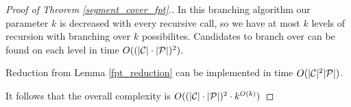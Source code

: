 \begin{proof}[Proof of Theorem \ref{segment_cover_fpt}.]
In this branching algorithm our parameter $k$ is decreased with every
recursive call, so we have at most $k$ levels of recursion with
branching over $k$ possibilites. Candidates to branch over
can be found on each level in time $O((|\mathcal{C}|\cdot|\mathcal{P}|)^2)$.

Reduction from Lemma \ref{fpt_reduction} can be implemented in time $O(|\mathcal{C}|^2|\mathcal{P}|)$.

It follows that the overall complexity is $O((|\mathcal{C}|\cdot|\mathcal{P}|)^2 \cdot k^{O(k)})$
\end{proof}

